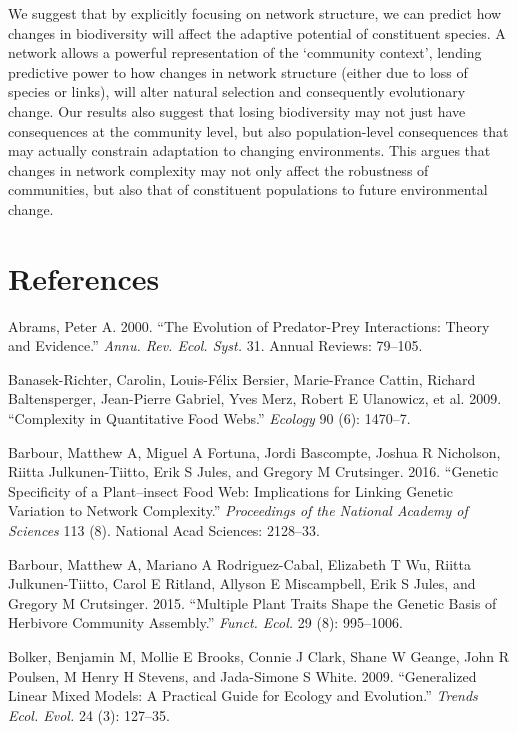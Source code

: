 \documentclass[]{elsarticle} %
\begin{document}
We suggest that by explicitly focusing on network structure, we can
predict how changes in biodiversity will affect the adaptive potential
of constituent species. A network allows a powerful representation of
the `community context', lending predictive power to how changes in
network structure (either due to loss of species or links), will alter
natural selection and consequently evolutionary change. Our results also
suggest that losing biodiversity may not just have consequences at the
community level, but also population-level consequences that may
actually constrain adaptation to changing environments. This argues that
changes in network complexity may not only affect the robustness of
communities, but also that of constituent populations to future
environmental change.

\section*{References}\label{references}

\hypertarget{refs}{}
\hypertarget{ref-Abrams2000}{}
Abrams, Peter A. 2000. ``The Evolution of Predator-Prey Interactions:
Theory and Evidence.'' \emph{Annu. Rev. Ecol. Syst.} 31. Annual Reviews:
79--105.

\hypertarget{ref-Banasek-Richter2009}{}
Banasek-Richter, Carolin, Louis-Félix Bersier, Marie-France Cattin,
Richard Baltensperger, Jean-Pierre Gabriel, Yves Merz, Robert E
Ulanowicz, et al. 2009. ``Complexity in Quantitative Food Webs.''
\emph{Ecology} 90 (6): 1470--7.

\hypertarget{ref-Barbour2016}{}
Barbour, Matthew A, Miguel A Fortuna, Jordi Bascompte, Joshua R
Nicholson, Riitta Julkunen-Tiitto, Erik S Jules, and Gregory M
Crutsinger. 2016. ``Genetic Specificity of a Plant--insect Food Web:
Implications for Linking Genetic Variation to Network Complexity.''
\emph{Proceedings of the National Academy of Sciences} 113 (8). National
Acad Sciences: 2128--33.

\hypertarget{ref-Barbour2015}{}
Barbour, Matthew A, Mariano A Rodriguez-Cabal, Elizabeth T Wu, Riitta
Julkunen-Tiitto, Carol E Ritland, Allyson E Miscampbell, Erik S Jules,
and Gregory M Crutsinger. 2015. ``Multiple Plant Traits Shape the
Genetic Basis of Herbivore Community Assembly.'' \emph{Funct. Ecol.} 29
(8): 995--1006.

\hypertarget{ref-Bolker2009}{}
Bolker, Benjamin M, Mollie E Brooks, Connie J Clark, Shane W Geange,
John R Poulsen, M Henry H Stevens, and Jada-Simone S White. 2009.
``Generalized Linear Mixed Models: A Practical Guide for Ecology and
Evolution.'' \emph{Trends Ecol. Evol.} 24 (3): 127--35.
\end{document}

